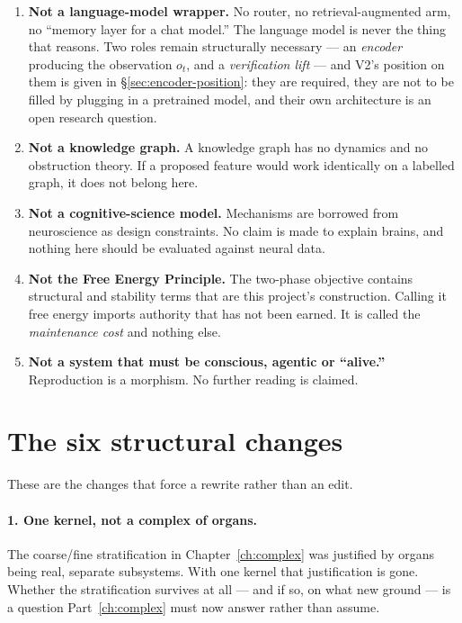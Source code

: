 \begin{enumerate}
  \item \textbf{Not a language-model wrapper.} No router, no
    retrieval-augmented arm, no ``memory layer for a chat model.'' The
    language model is never the thing that reasons. Two roles remain
    structurally necessary --- an \emph{encoder} producing the observation
    $o_t$, and a \emph{verification lift} --- and V2's position on them is
    given in \S\ref{sec:encoder-position}: they are required, they are not to
    be filled by plugging in a pretrained model, and their own architecture
    is an open research question.
  \item \textbf{Not a knowledge graph.} A knowledge graph has no dynamics and
    no obstruction theory. If a proposed feature would work identically on a
    labelled graph, it does not belong here.
  \item \textbf{Not a cognitive-science model.} Mechanisms are borrowed from
    neuroscience as design constraints. No claim is made to explain brains,
    and nothing here should be evaluated against neural data.
  \item \textbf{Not the Free Energy Principle.} The two-phase objective
    contains structural and stability terms that are this project's
    construction. Calling it free energy imports authority that has not been
    earned. It is called the \emph{maintenance cost} and nothing else.
  \item \textbf{Not a system that must be conscious, agentic or ``alive.''}
    Reproduction is a morphism. No further reading is claimed.
\end{enumerate}

\section{The six structural changes}

These are the changes that force a rewrite rather than an edit.

\paragraph{1. One kernel, not a complex of organs.} The coarse/fine
stratification in Chapter~\ref{ch:complex} was justified by organs being real,
separate subsystems. With one kernel that justification is gone. Whether the
stratification survives at all --- and if so, on what new ground --- is a
question Part~\ref{ch:complex} must now answer rather than assume.

